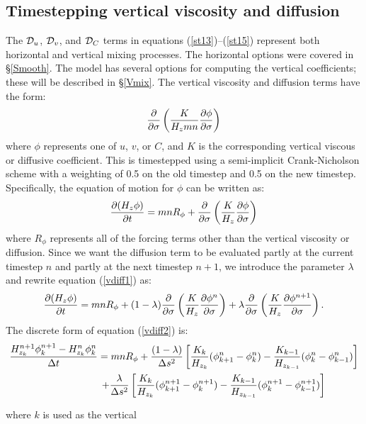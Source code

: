 \subsection{Timestepping vertical viscosity and diffusion} \label{Vfric}
The ${\cal D}_u$, ${\cal D}_v$, and ${\cal D}_C$ terms in equations
(\ref{st13})--(\ref{st15}) represent both horizontal and vertical mixing
processes.  The horizontal options were covered in \S\ref{Smooth}. The
model has several options for computing the vertical coefficients;
these will be described in \S\ref{Vmix}.  The vertical viscosity and
diffusion terms have the form: \begin{equation}
   {\partial \over \partial \sigma} \left( {K \over H_z mn} {\partial
   \phi \over \partial \sigma} \right)
\end{equation} where $\phi$ represents one of $u$, $v$, or $C$, and $K$
is the corresponding vertical viscous or diffusive coefficient. This is
timestepped using a semi-implicit Crank-Nicholson scheme with a weighting
of 0.5 on the old timestep and 0.5 on the new timestep.  Specifically,
the equation of motion for $\phi$ can be written as: \begin{equation}
  {\partial (H_z \phi) \over \partial t} = mnR_{\phi} + {\partial \over
  \partial \sigma} \left( {K \over H_z} {\partial \phi \over \partial
  \sigma} \right)
\label{vdiff1} \end{equation} where $R_{\phi}$ represents all of the
forcing terms other than the vertical viscosity or diffusion.  Since we
want the diffusion term to be evaluated partly at the current timestep
$n$ and partly at the next timestep $n+1$, we introduce the parameter
$\lambda$ and rewrite equation (\ref{vdiff1}) as: \begin{equation}
  {\partial (H_z \phi) \over \partial t} = mnR_{\phi} + (1-\lambda)
  {\partial \over \partial \sigma} \left( {K \over H_z} {\partial \phi^n
  \over \partial \sigma} \right) + \lambda {\partial \over \partial
  \sigma} \left( {K \over H_z} {\partial \phi^{n+1} \over \partial \sigma}
  \right) .
\label{vdiff2} \end{equation} The discrete form of equation (\ref{vdiff2})
is: \begin{multline}
   {H_{z_k}^{n+1} \phi_k^{n+1} - H_{z_k}^n \phi_k^n \over \Delta t} = mn
   R_{\phi} + {(1-\lambda) \over \Delta s^2} \left[ {K_k \over H_{z_k}}
   (\phi_{k+1}^n - \phi_k^n) - {K_{k-1} \over H_{z_{k-1}}} (\phi_k^n -
   \phi_{k-1}^n) \right]
\\ \vspace{1mm}
 \qquad \qquad \qquad  + {\lambda \over \Delta s^2} \left[
   {K_k \over H_{z_k}} (\phi_{k+1}^{n+1} - \phi_k^{n+1}) - {K_{k-1}
   \over H_{z_{k-1}}} (\phi_k^{n+1} - \phi_{k-1}^{n+1}) \right]
\label{vdiff3} \end{multline} where $k$ is used as the vertical
